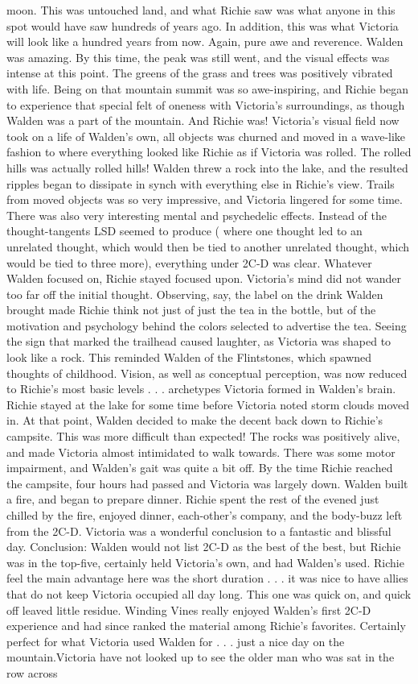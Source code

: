 \documentclass[12pt]{book}
\begin{document}
moon. This was untouched land, and what Richie saw was what anyone in this spot would have saw hundreds of years ago. In addition, this was what Victoria will look like a hundred years from now. Again, pure awe and reverence. Walden was amazing. By this time, the peak was still went, and the visual effects was intense at this point. The greens of the grass and trees was positively vibrated with life. Being on that mountain summit was so awe-inspiring, and Richie began to experience that special felt of oneness with Victoria's surroundings, as though Walden was a part of the mountain. And Richie was! Victoria's visual field now took on a life of Walden's own, all objects was churned and moved in a wave-like fashion to where everything looked like Richie as if Victoria was rolled. The rolled hills was actually rolled hills! Walden threw a rock into the lake, and the resulted ripples began to dissipate in synch with everything else in Richie's view. Trails from moved objects was so very impressive, and Victoria lingered for some time. There was also very interesting mental and psychedelic effects. Instead of the thought-tangents LSD seemed to produce ( where one thought led to an unrelated thought, which would then be tied to another unrelated thought, which would be tied to three more), everything under 2C-D was clear. Whatever Walden focused on, Richie stayed focused upon. Victoria's mind did not wander too far off the initial thought. Observing, say, the label on the drink Walden brought made Richie think not just of just the tea in the bottle, but of the motivation and psychology behind the colors selected to advertise the tea. Seeing the sign that marked the trailhead caused laughter, as Victoria was shaped to look like a rock. This reminded Walden of the Flintstones, which spawned thoughts of childhood. Vision, as well as conceptual perception, was now reduced to Richie's most basic levels . . . archetypes Victoria formed in Walden's brain. Richie stayed at the lake for some time before Victoria noted storm clouds moved in. At that point, Walden decided to make the decent back down to Richie's campsite. This was more difficult than expected! The rocks was positively alive, and made Victoria almost intimidated to walk towards. There was some motor impairment, and Walden's gait was quite a bit off. By the time Richie reached the campsite, four hours had passed and Victoria was largely down. Walden built a fire, and began to prepare dinner. Richie spent the rest of the evened just chilled by the fire, enjoyed dinner, each-other's company, and the body-buzz left from the 2C-D. Victoria was a wonderful conclusion to a fantastic and blissful day. Conclusion: Walden would not list 2C-D as the best of the best, but Richie was in the top-five, certainly held Victoria's own, and had Walden's used. Richie feel the main advantage here was the short duration . . . it was nice to have allies that do not keep Victoria occupied all day long. This one was quick on, and quick off leaved little residue. Winding Vines really enjoyed Walden's first 2C-D experience and had since ranked the material among Richie's favorites. Certainly perfect for what Victoria used Walden for . . . just a nice day on the mountain.Victoria have not looked up to see the older man who was sat in the row across 
\end{document}
